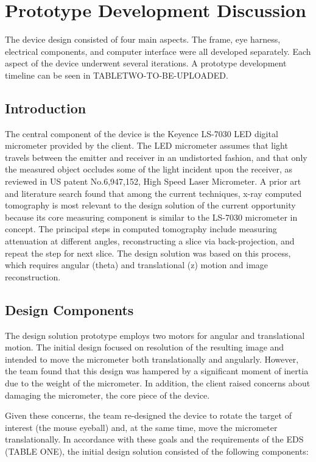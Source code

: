 \documentclass{article}
\begin{document}
\section{Prototype Development Discussion}
\label{sec:prot-devel-disc}
 
The device design consisted of four main aspects. The frame, eye harness, electrical components, and computer interface were all developed separately. Each aspect of the device underwent several iterations. A prototype development timeline can be seen in TABLETWO-TO-BE-UPLOADED.

\subsection{Introduction}
\label{sec:prior-art}
	The central component of the device is the Keyence LS-7030 LED digital micrometer provided by 
the client. The LED micrometer assumes that light travels between the emitter and receiver in an 
undistorted fashion, and that only the measured object occludes some of the light incident upon the 
receiver, as reviewed in US patent No.6,947,152, High Speed Laser Micrometer.  A prior art and literature search found that among the current techniques, x-ray computed tomography is most relevant to the design solution of the current opportunity because its core measuring component is similar to the LS-7030 micrometer in concept. The principal steps in computed tomography 
include measuring attenuation at different angles, reconstructing a slice via back-projection, and repeat the step for next slice. The design solution was based on this process, which requires angular (theta) and 
translational (z) motion and image reconstruction. 

\subsection{Design Components}
\label{sec:prototype-comp}
	
The design solution prototype employs two motors for angular and translational motion. The initial design focused on resolution of the resulting image and intended to move the micrometer both translationally and angularly. However, the team found that this design was hampered by a significant moment of inertia due to the weight of the micrometer. In addition, the client raised concerns about damaging the micrometer, the core piece of the device. 

Given these concerns, the team re-designed the device to rotate the target of interest (the mouse eyeball) and, at the same time, move the micrometer translationally. In accordance with these goals and the requirements of the EDS (TABLE ONE), the initial design solution consisted of the following components: 
\end{document}
